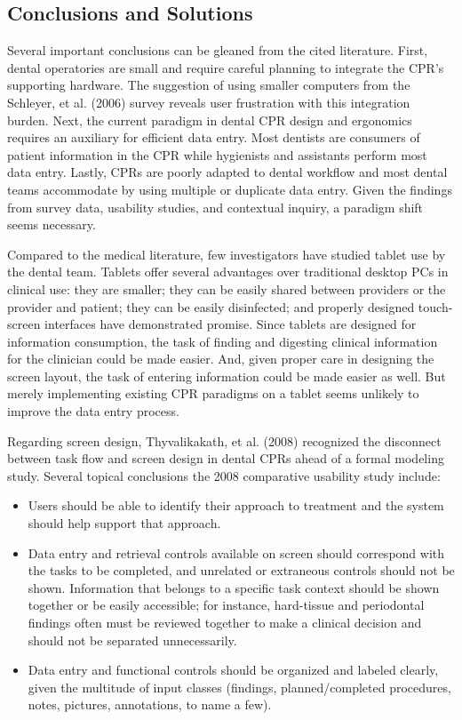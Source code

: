 \documentclass[11pt]{article}
\begin{document}
\subsection{Conclusions and Solutions}
Several important conclusions can be gleaned from the cited literature. First, dental operatories are small and require careful planning to integrate the CPR's supporting hardware. The suggestion of using smaller computers from the Schleyer, et al. (2006) survey reveals user frustration with this integration burden. Next, the current paradigm in dental CPR design and ergonomics requires an auxiliary for efficient data entry. Most dentists are consumers of patient information in the CPR while hygienists and assistants perform most data entry. Lastly, CPRs are poorly adapted to dental workflow and most dental teams accommodate by using multiple or duplicate data entry. Given the findings from survey data, usability studies, and contextual inquiry, a paradigm shift seems necessary.

Compared to the medical literature, few investigators have studied tablet use by the dental team. Tablets offer several advantages over traditional desktop PCs in clinical use: they are smaller; they can be easily shared between providers or the provider and patient; they can be easily disinfected; and properly designed touch-screen interfaces have demonstrated promise.\cite{Haller2009Handheld-vs.-la,Kirby1996The-PEN--PAD-da,Mackenzi2002Text-entry-for-,Mayrhofer2007Pen-based-Elect,Mulligen1998Clinical-data-e} Since tablets are designed for information consumption, the task of finding and digesting clinical information for the clinician could be made easier. And, given proper care in designing the screen layout, the task of entering information could be made easier as well. But merely implementing existing CPR paradigms on a tablet seems unlikely to improve the data entry process.

Regarding screen design, Thyvalikakath, et al. (2008) recognized the disconnect between task flow and screen design in dental CPRs ahead of a formal modeling study. Several topical conclusions the 2008 comparative usability study include: \begin{itemize}
\item Users should be able to identify their approach to treatment and the system should help support that approach.
\item Data entry and retrieval controls available on screen should correspond with the tasks to be completed, and unrelated or extraneous controls should not be shown. Information that belongs to a specific task context should be shown together or be easily accessible; for instance, hard-tissue and periodontal findings often must be reviewed together to make a clinical decision and should not be separated unnecessarily.
\item Data entry and functional controls should be organized and labeled clearly, given the multitude of input classes (findings, planned/completed procedures, notes, pictures, annotations, to name a few).
\end{itemize}
\end{document}
